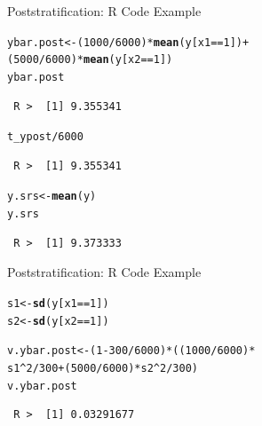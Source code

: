 \documentclass[10pt]{beamer}\usepackage[]{graphicx}\usepackage[]{xcolor}
\makeatletter
\newcommand{\hlnum}[1]{\textcolor[rgb]{0.686,0.059,0.569}{#1}}%
\newcommand{\hlopt}[1]{\textcolor[rgb]{0,0,0}{#1}}%
\newcommand{\hlstd}[1]{\textcolor[rgb]{0.345,0.345,0.345}{#1}}%
\newcommand{\hlkwb}[1]{\textcolor[rgb]{0.69,0.353,0.396}{#1}}%
\newcommand{\hlkwd}[1]{\textcolor[rgb]{0.737,0.353,0.396}{\textbf{#1}}}%
\newenvironment{kframe}{%
 \def\at@end@of@kframe{}%
 \ifinner\ifhmode%
  \def\at@end@of@kframe{\end{minipage}}%
  \begin{minipage}{\columnwidth}%
 \fi\fi%
 \def\FrameCommand##1{\hskip\@totalleftmargin \hskip-\fboxsep
 \colorbox{shadecolor}{##1}\hskip-\fboxsep
     \hskip-\linewidth \hskip-\@totalleftmargin \hskip\columnwidth}%
 \MakeFramed {\advance\hsize-\width
   \@totalleftmargin\z@ \linewidth\hsize
   \@setminipage}}%
 {\par\unskip\endMakeFramed%
 \at@end@of@kframe}
\newenvironment{knitrout}{}{} %
\makeatother
\begin{document}
\begin{frame}[containsverbatim]{Poststratification: R Code Example}
\small
\begin{knitrout}
\color{fgcolor}\begin{kframe}
\begin{alltt}
\hlstd{ybar.post} \hlkwb{<-} \hlstd{(}\hlnum{1000}\hlopt{/}\hlnum{6000}\hlstd{)} \hlopt{*} \hlkwd{mean}\hlstd{(y[x1} \hlopt{==} \hlnum{1}\hlstd{])} \hlopt{+}
    \hlstd{(}\hlnum{5000}\hlopt{/}\hlnum{6000}\hlstd{)} \hlopt{*} \hlkwd{mean}\hlstd{(y[x2} \hlopt{==} \hlnum{1}\hlstd{])}
\hlstd{ybar.post}
\end{alltt}
\begin{verbatim}
 R >  [1] 9.355341
\end{verbatim}
\begin{alltt}
\hlstd{t_ypost}\hlopt{/}\hlnum{6000}
\end{alltt}
\begin{verbatim}
 R >  [1] 9.355341
\end{verbatim}
\begin{alltt}
\hlstd{y.srs} \hlkwb{<-} \hlkwd{mean}\hlstd{(y)}
\hlstd{y.srs}
\end{alltt}
\begin{verbatim}
 R >  [1] 9.373333
\end{verbatim}
\end{kframe}
\end{knitrout}
\end{frame}

\begin{frame}[containsverbatim]{Poststratification: R Code Example}
\small
\begin{knitrout}
\color{fgcolor}\begin{kframe}
\begin{alltt}
\hlstd{s1} \hlkwb{<-} \hlkwd{sd}\hlstd{(y[x1} \hlopt{==} \hlnum{1}\hlstd{])}
\hlstd{s2} \hlkwb{<-} \hlkwd{sd}\hlstd{(y[x2} \hlopt{==} \hlnum{1}\hlstd{])}

\hlstd{v.ybar.post} \hlkwb{<-} \hlstd{(}\hlnum{1} \hlopt{-} \hlnum{300}\hlopt{/}\hlnum{6000}\hlstd{)} \hlopt{*} \hlstd{((}\hlnum{1000}\hlopt{/}\hlnum{6000}\hlstd{)} \hlopt{*}
    \hlstd{s1}\hlopt{^}\hlnum{2}\hlopt{/}\hlnum{300} \hlopt{+} \hlstd{(}\hlnum{5000}\hlopt{/}\hlnum{6000}\hlstd{)} \hlopt{*} \hlstd{s2}\hlopt{^}\hlnum{2}\hlopt{/}\hlnum{300}\hlstd{)}
\hlstd{v.ybar.post}
\end{alltt}
\begin{verbatim}
 R >  [1] 0.03291677
\end{verbatim}
\end{kframe}
\end{knitrout}
\end{frame}
\end{document}
